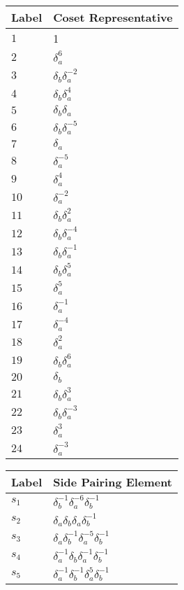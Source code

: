 \documentclass{article}
\begin{document}

\begin{center}
\begin{tabular}{ll}
\toprule
Label & Coset Representative\\
\midrule
$1$ & 1 \\
$2$ & $\delta_a^{6}$ \\
$3$ & $\delta_b^{}\delta_a^{-2}$ \\
$4$ & $\delta_b^{}\delta_a^{4}$ \\
$5$ & $\delta_b^{}\delta_a^{}$ \\
$6$ & $\delta_b^{}\delta_a^{-5}$ \\
$7$ & $\delta_a^{}$ \\
$8$ & $\delta_a^{-5}$ \\
$9$ & $\delta_a^{4}$ \\
$10$ & $\delta_a^{-2}$ \\
$11$ & $\delta_b^{}\delta_a^{2}$ \\
$12$ & $\delta_b^{}\delta_a^{-4}$ \\
$13$ & $\delta_b^{}\delta_a^{-1}$ \\
$14$ & $\delta_b^{}\delta_a^{5}$ \\
$15$ & $\delta_a^{5}$ \\
$16$ & $\delta_a^{-1}$ \\
$17$ & $\delta_a^{-4}$ \\
$18$ & $\delta_a^{2}$ \\
$19$ & $\delta_b^{}\delta_a^{6}$ \\
$20$ & $\delta_b^{}$ \\
$21$ & $\delta_b^{}\delta_a^{3}$ \\
$22$ & $\delta_b^{}\delta_a^{-3}$ \\
$23$ & $\delta_a^{3}$ \\
$24$ & $\delta_a^{-3}$ \\
\bottomrule
\end{tabular}
\hfill
\begin{tabular}{ll}
\toprule
Label & Side Pairing Element\\
\midrule
$s_{1}$ & $\delta_b^{-1}\delta_a^{-6}\delta_b^{-1}$ \\
$s_{2}$ & $\delta_a^{}\delta_b^{}\delta_a^{}\delta_b^{-1}$ \\
$s_{3}$ & $\delta_a^{}\delta_b^{-1}\delta_a^{-5}\delta_b^{-1}$ \\
$s_{4}$ & $\delta_a^{-1}\delta_b^{}\delta_a^{-1}\delta_b^{-1}$ \\
$s_{5}$ & $\delta_a^{-1}\delta_b^{-1}\delta_a^{5}\delta_b^{-1}$ \\

\end{tabular}
\end{center}
\end{document}
